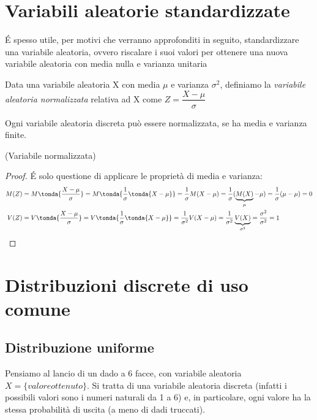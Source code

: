  \section{Variabili aleatorie standardizzate}
 \label{sec:02_standardizzate}
 
 \'E spesso utile, per motivi che verranno approfonditi in seguito, standardizzare una variabile aleatoria, ovvero riscalare i suoi valori per ottenere una nuova variabile aleatoria con media nulla e varianza unitaria
 
 \begin{definizione} Data una variabile aleatoria X con media $\mu$ e varianza $\sigma^2$, definiamo la \emph{variabile aleatoria normalizzata} relativa ad X come $\boxed{Z = \dfrac{X-\mu}{\sigma}}$
 \end{definizione}
 
 Ogni variabile aleatoria discreta può essere normalizzata, se ha media e varianza finite.

\begin{proprieta} (Variabile normalizzata) \quad {} \quad {}
\end{proprieta}
\begin{proof} \'E solo questione di applicare le proprietà di media e varianza:
\[\begin{split}M(Z) &= M\tonda{\dfrac{X-\mu}{\sigma}} = M\tonda{\dfrac{1}{\sigma} \tonda{X-\mu}} = \dfrac{1}{\sigma} M(X-\mu) = \dfrac{1}{\sigma} (\underbrace{M(X)}_{\mu}-\mu) =  \dfrac{1}{\sigma} (\mu-\mu)=0  \\
V(Z) &= V\tonda{\dfrac{X-\mu}{\sigma}} = V\tonda{\dfrac{1}{\sigma} \tonda{X-\mu}} = \dfrac{1}{\sigma^2} V(X-\mu)=\dfrac{1}{\sigma^2} \underbrace{V(X)}_{\sigma^2} = \dfrac{\sigma^2}{\sigma^2} = 1\end{split}\]
\end{proof}
\section{Distribuzioni discrete di uso comune}
\label{sec:02_distrib_discrete}

\subsection{Distribuzione uniforme}
Pensiamo al lancio di un dado a 6 facce, con variabile aleatoria $X = \{valore ottenuto\}$. Si tratta di una variabile aleatoria discreta (infatti i possibili valori sono i numeri naturali da 1 a 6) e, in particolare, ogni valore ha la stessa probabilità di uscita (a meno di dadi truccati).

